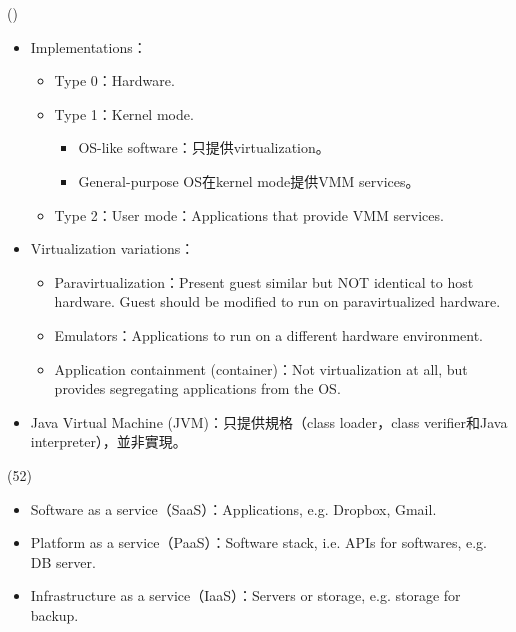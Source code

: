 \begin{theorem}{()} \quad\quad \begin{itemize}
        \item Implementations：\begin{itemize}
            \item Type 0：Hardware.
            \item Type 1：Kernel mode. \begin{itemize}
                \item OS-like software：只提供virtualization。
                \item General-purpose OS在kernel mode提供VMM services。
            \end{itemize}
            \item Type 2：User mode：Applications that provide VMM services.
        \end{itemize}
        \item Virtualization variations：\begin{itemize}
            \item Paravirtualization：Present guest similar but NOT identical to host hardware. Guest should be modified to run on paravirtualized hardware.
            \item Emulators：Applications to run on a different hardware environment.
            \item Application containment (container)：Not virtualization at all, but provides segregating applications from the OS.
        \end{itemize}
        \item Java Virtual Machine (JVM)：只提供規格（class loader，class verifier和Java interpreter），並非實現。
    \end{itemize}
\end{theorem}

\begin{theorem}{(52)} \quad\quad \begin{itemize}
        \item Software as a service（SaaS）：Applications, e.g. Dropbox, Gmail.
        \item Platform as a service（PaaS）：Software stack, i.e. APIs for softwares, e.g. DB server.
        \item Infrastructure as a service（IaaS）：Servers or storage, e.g. storage for backup.
    \end{itemize}
\end{theorem}
